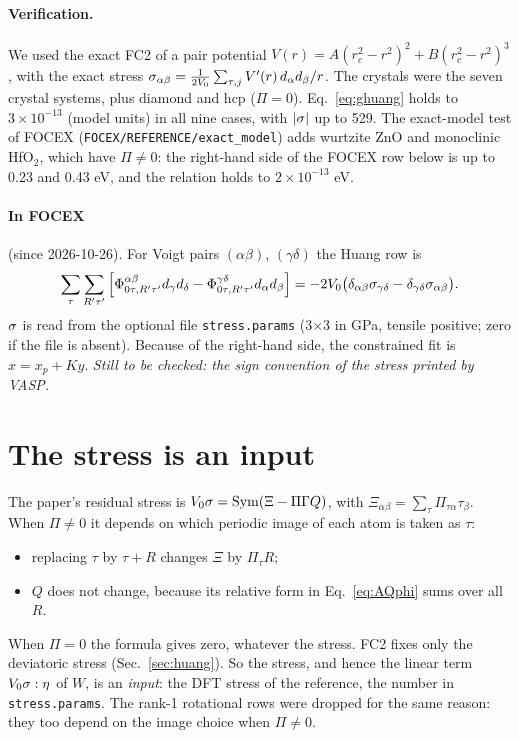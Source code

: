 \documentclass[11pt,a4paper]{article}
\newcommand{\al}{\alpha}\newcommand{\be}{\beta}\newcommand{\ga}{\gamma}\newcommand{\de}{\delta}
\begin{document}
\paragraph{Verification.} We used the exact FC2 of a pair potential $V(r)=A(r_c^2-r^2)^2+B(r_c^2-r^2)^3$,
with the exact stress $\si_{\al\be}=\frac1{2V_0}\sum_{\tau,j}V'(r)\,d_\al d_\be/r$. The crystals were the seven
crystal systems, plus diamond and hcp ($\Pi=0$). Eq.~\eqref{eq:ghuang} holds to $3\times10^{-13}$ (model
units) in all nine cases, with $|\sigma|$ up to 529. The exact-model test of FOCEX
(\texttt{FOCEX/REFERENCE/exact\_model}) adds wurtzite ZnO and monoclinic HfO$_2$, which have
$\Pi\neq0$: the right-hand side of the FOCEX row below is up to 0.23 and 0.43 eV, and the relation
holds to $2\times10^{-13}$ eV.

\paragraph{In FOCEX} (since 2026-10-26). For Voigt pairs $(\al\be)$, $(\ga\de)$ the Huang row is
\[
\sum_\tau\sum_{R'\tau'}\Big[\Phi^{\al\be}_{0\tau,R'\tau'}d_\ga d_\de-\Phi^{\ga\de}_{0\tau,R'\tau'}d_\al d_\be\Big]
=-2V_0\big(\de_{\al\be}\si_{\ga\de}-\de_{\ga\de}\si_{\al\be}\big).
\]
$\sigma$ is read from the optional file \texttt{stress.params} (3$\times$3 in GPa, tensile positive; zero if
the file is absent). Because of the right-hand side, the constrained fit is $x=x_p+Ky$. \emph{Still to be
checked: the sign convention of the stress printed by VASP.}

\section{The stress is an input}\label{sec:stress}
The paper's residual stress is $V_0\sigma=\mathrm{Sym}(\Xi-\Pi\Gamma Q)$, with $\Xi_{\al\be}=\sum_\tau\Pi_{\tau\al}\tau_\be$.
When $\Pi\neq0$ it depends on which periodic image of each atom is taken as $\tau$:
\begin{itemize}
\item replacing $\tau$ by $\tau+R$ changes $\Xi$ by $\Pi_\tau R$;
\item $Q$ does not change, because its relative form in Eq.~\eqref{eq:AQphi} sums over all $R$.
\end{itemize}
When $\Pi=0$ the formula gives zero, whatever the stress. FC2 fixes only the deviatoric stress
(Sec.~\ref{sec:huang}). So the stress, and hence the linear term $V_0\sigma:\eta$ of $W$, is an \emph{input}:
the DFT stress of the reference, the number in \texttt{stress.params}. The rank-1 rotational rows were
dropped for the same reason: they too depend on the image choice when $\Pi\neq0$.
\end{document}
